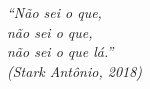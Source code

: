 \begin{epigrafe}
    \vspace*{\fill}
	\begin{flushright}
		\textit{``Não sei o que, \\
		          não sei o que,\\
                  não sei o que lá.''\\
		          (Stark Antônio, 2018)}
	\end{flushright}
\end{epigrafe}
